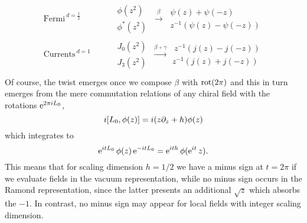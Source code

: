  \begin{align*}
 {\text{Fermi}}^{\ d=\frac{1}{2}}& \qquad
             \begin{matrix}
             \phi(z^2)\\[1ex]
             \phi^*(z^2)
             \end{matrix}\
             \overset{\beta}{\longrightarrow}\
             \begin{matrix}
             \psi(z)+\psi(-z)\\[1ex]
             z^{-1}\left(\psi(z)-\psi(-z)\right)
             \end{matrix}\\[3ex]
 {\text{Currents}}^{\ d=1}&\qquad
             \begin{matrix}
             J_0(z^2)\\[1ex]
             J_3(z^2)
             \end{matrix}\
             \xrightarrow[]{\beta\,\circ\,\gamma}
             \begin{matrix}\
             z^{-1}\left(j(z)-j(-z)\right)\\[1ex]
             z^{-1}\left(j(z)+j(-z)\right)
             \end{matrix}\\
 \end{align*}
 Of course, the twist emerges once we compose $\beta$ with
 $\operatorname{rot}(2\pi)$ and this in turn emerges from the mere
 commutation relations of any chiral field with the
 rotations $\operatorname{e}^{2\pi iL_0}$,
 \[
 i[L_0,\phi(z)]=i(z\partial_z +h)\phi(z)
 \]
 which integrates to
 \[
 \operatorname{e}^{it L_0}\phi(z)\operatorname{e}^{-itL_0}=\operatorname{e}^{ith}\phi(\operatorname{e}^{it}z).
 \]
 This means that for scaling dimension $h=1/2$ we have a minus 
 sign at $t=2\pi$ if we evaluate fields in the vacuum 
 representation, while no minus sign occurs in the Ramond
 representation, since the latter presents an additional
 $\sqrt{z}$ which absorbs the $-1$. In contrast, no minus
 sign may appear for local fields with integer scaling dimension.  
 
